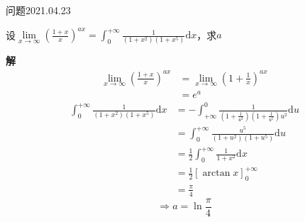 \begin{mybox}{问题2021.04.23}
	
	\qquad 设$\lim\limits_{x\to \infty} (\frac{1+x}{x})^{ax}=\int_{0}^{+\infty} \frac{1}{(1+x^2)(1+x^5)} \mathrm{d}x$，求$a$
\end{mybox}
\noindent
\textbf{解}
\begin{align*}
	\lim\limits_{x \to\infty}(\frac{1+x}{x})^{ax}&=\lim\limits_{x\to\infty}(1+\frac{1}{x})^{ax}\\
	&=e^{a}
\end{align*}
\begin{align*}
	\int_{0}^{+\infty}\frac{1}{(1+x^2)(1+x^5)}\mathrm{d}x&=-\int_{+\infty}^{0}\frac{1}{(1+\frac{1}{u^2})(1+\frac{1}{u^5})u^2}\mathrm{d}u\\
	&=\int_{0}^{+\infty}\frac{u^5}{(1+u^2)(1+u^5)}\mathrm{d}u\\
	&=\frac{1}{2}\int_{0}^{+\infty}\frac{1}{1+x^2}\mathrm{d}x\\
	&=\frac{1}{2}[\arctan x]_{0}^{+\infty}\\
	&=\frac{\pi}{4}
\end{align*}
$$\Rightarrow a=\ln \frac{\pi}{4} $$
